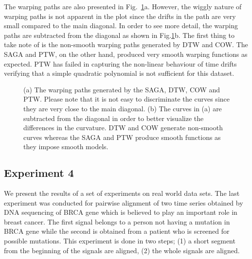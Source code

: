 \documentclass[number,1p,12pt]{elsarticle}
\begin{document}
The warping paths are also presented in Fig.~\ref{Figure09}a. However, the wiggly nature of warping paths is not apparent in the plot since the drifts in the path are very small compared to the main diagonal. In order to see more detail, the warping paths are subtracted from the diagonal as shown in Fig.\ref{Figure09}b.  The first thing to take note of is the non-smooth warping paths generated by DTW and COW. The SAGA and PTW,  on the other hand,  produced very smooth warping functions as expected. PTW has failed in capturing the non-linear behaviour of time drifts verifying that a simple quadratic polynomial is not sufficient for this dataset. 



\begin{figure}
\caption{(a) The warping paths generated by the SAGA, DTW, COW and PTW. Please note that it is not easy to discriminate the curves since they are very close to the main diagonal. (b) The curves in (a) are subtracted from the diagonal in order to better visualize the differences in the curvature. DTW and COW generate non-smooth curves whereas the SAGA and PTW produce smooth functions as they impose smooth models.}
\label{Figure09}
\end{figure} 

\subsection{Experiment 4}
We present the results of a set of experiments on real world data sets. The last experiment was conducted for pairwise alignment of two time series obtained by DNA sequencing of BRCA gene which is believed to play an important role in breast cancer. The first signal belongs to a person not having a mutation in BRCA gene while the second is obtained from a patient who is screened for possible mutations. This experiment is done in two steps; (1) a short segment from the beginning of the signals are aligned, (2) the whole signals are aligned. 
\end{document}
